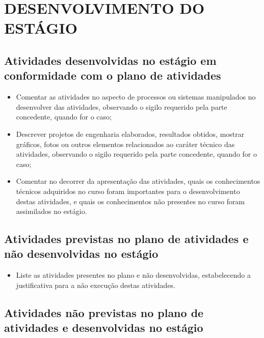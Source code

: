 \documentclass[12pt]{article}
\begin{document}
\section{DESENVOLVIMENTO DO ESTÁGIO}
\subsection{Atividades desenvolvidas no estágio em conformidade com o plano de atividades}

{\color{red}
\begin{justify}
    \begin{itemize}
        \item Comentar as atividades no aspecto de processos ou sistemas manipulados no desenvolver das atividades, observando o sigilo requerido pela parte concedente, quando for o caso;
        
        \item Descrever projetos de engenharia elaborados, resultados obtidos, mostrar gráficos, fotos ou outros elementos relacionados ao caráter técnico das atividades, observando o sigilo requerido pela parte concedente, quando for o caso;

        \item Comentar no decorrer da apresentação das atividades, quais os conhecimentos técnicos adquiridos no curso foram importantes para o desenvolvimento destas atividades, e quais os conhecimentos não presentes no curso foram assimilados no estágio.

    \end{itemize}
\end{justify}
}

\subsection{Atividades previstas no plano de atividades e não desenvolvidas no estágio}

{\color{red}
\begin{justify}
    \begin{itemize}
        \item Liste as atividades presentes no plano e não desenvolvidas, estabelecendo a justificativa para a não execução destas atividades.

    \end{itemize}
\end{justify}
}

\subsection{Atividades não previstas no plano de atividades e desenvolvidas no estágio}
\end{document}
